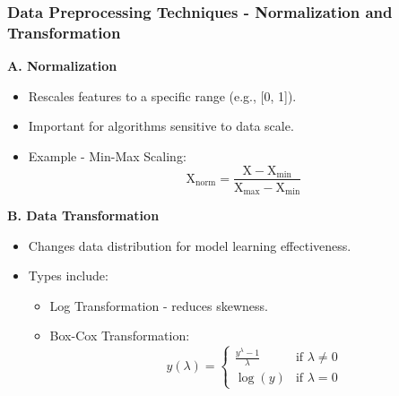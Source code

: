 \documentclass[aspectratio=169]{beamer}
\begin{document}
\begin{frame}
  \frametitle{Data Preprocessing Techniques - Normalization and Transformation}

  \textbf{A. Normalization}
  \begin{itemize}
    \item Rescales features to a specific range (e.g., [0, 1]).
    \item Important for algorithms sensitive to data scale.
    \item Example - Min-Max Scaling:
    \begin{equation}
      \text{X}_{\text{norm}} = \frac{\text{X} - \text{X}_{\text{min}}}{\text{X}_{\text{max}} - \text{X}_{\text{min}}}
    \end{equation}
  \end{itemize}

  \textbf{B. Data Transformation}
  \begin{itemize}
    \item Changes data distribution for model learning effectiveness.
    \item Types include:
      \begin{itemize}
        \item Log Transformation - reduces skewness.
        \item Box-Cox Transformation:
        \begin{equation}
          y(\lambda) = 
          \begin{cases} 
            \frac{y^{\lambda} - 1}{\lambda} & \text{if } \lambda \neq 0 \\
            \log(y) & \text{if } \lambda = 0 
          \end{cases}
        \end{equation}
      \end{itemize}
  \end{itemize}
\end{frame}
\end{document}
